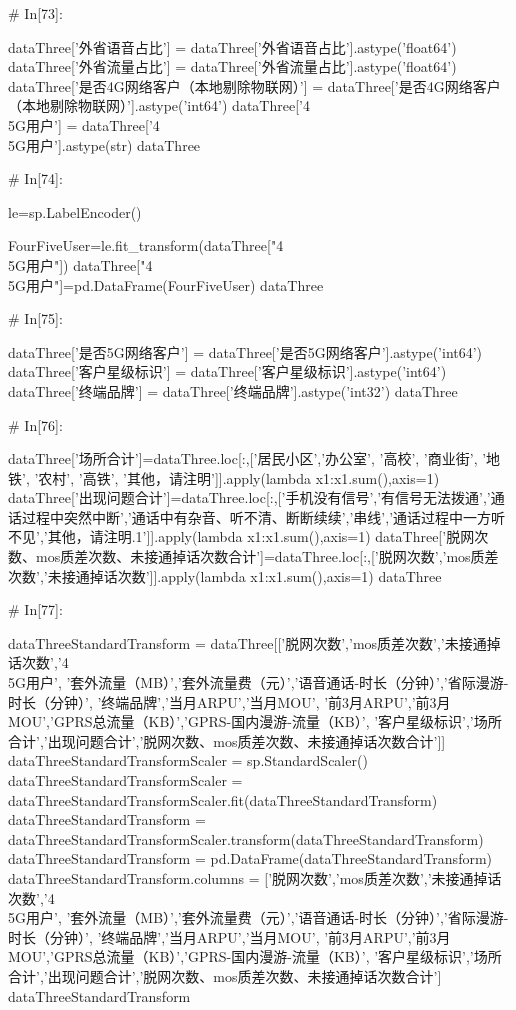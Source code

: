 \documentclass{MathorCupmodeling}
\begin{document}
\begin{python}
# In[73]:


dataThree['外省语音占比'] = dataThree['外省语音占比'].astype('float64')
dataThree['外省流量占比'] = dataThree['外省流量占比'].astype('float64')
dataThree['是否4G网络客户（本地剔除物联网）'] = dataThree['是否4G网络客户（本地剔除物联网）'].astype('int64')
dataThree['4\\5G用户'] = dataThree['4\\5G用户'].astype(str)
dataThree


# In[74]:


le=sp.LabelEncoder()

FourFiveUser=le.fit_transform(dataThree["4\\5G用户"])
dataThree["4\\5G用户"]=pd.DataFrame(FourFiveUser)
dataThree


# In[75]:


dataThree['是否5G网络客户'] = dataThree['是否5G网络客户'].astype('int64')
dataThree['客户星级标识'] = dataThree['客户星级标识'].astype('int64')
dataThree['终端品牌'] = dataThree['终端品牌'].astype('int32')
dataThree


# In[76]:


dataThree['场所合计']=dataThree.loc[:,['居民小区','办公室', '高校', '商业街', '地铁', '农村', '高铁', '其他，请注明']].apply(lambda x1:x1.sum(),axis=1)
dataThree['出现问题合计']=dataThree.loc[:,['手机没有信号','有信号无法拨通','通话过程中突然中断','通话中有杂音、听不清、断断续续','串线','通话过程中一方听不见','其他，请注明.1']].apply(lambda x1:x1.sum(),axis=1)
dataThree['脱网次数、mos质差次数、未接通掉话次数合计']=dataThree.loc[:,['脱网次数','mos质差次数','未接通掉话次数']].apply(lambda x1:x1.sum(),axis=1)
dataThree


# In[77]:


dataThreeStandardTransform = dataThree[['脱网次数','mos质差次数','未接通掉话次数','4\\5G用户', '套外流量（MB）','套外流量费（元）','语音通话-时长（分钟）','省际漫游-时长（分钟）', '终端品牌','当月ARPU','当月MOU', '前3月ARPU','前3月MOU','GPRS总流量（KB）','GPRS-国内漫游-流量（KB）', '客户星级标识','场所合计','出现问题合计','脱网次数、mos质差次数、未接通掉话次数合计']]
dataThreeStandardTransformScaler = sp.StandardScaler()
dataThreeStandardTransformScaler = dataThreeStandardTransformScaler.fit(dataThreeStandardTransform)
dataThreeStandardTransform = dataThreeStandardTransformScaler.transform(dataThreeStandardTransform)
dataThreeStandardTransform = pd.DataFrame(dataThreeStandardTransform)
dataThreeStandardTransform.columns = ['脱网次数','mos质差次数','未接通掉话次数','4\\5G用户', '套外流量（MB）','套外流量费（元）','语音通话-时长（分钟）','省际漫游-时长（分钟）', '终端品牌','当月ARPU','当月MOU', '前3月ARPU','前3月MOU','GPRS总流量（KB）','GPRS-国内漫游-流量（KB）', '客户星级标识','场所合计','出现问题合计','脱网次数、mos质差次数、未接通掉话次数合计']
dataThreeStandardTransform



\end{python}
\end{document}
